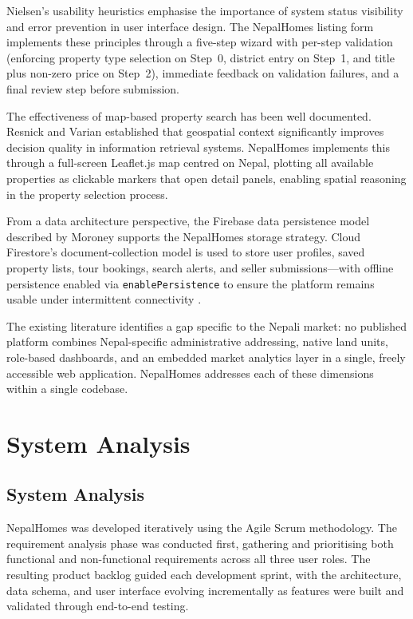 \documentclass[12pt,a4paper]{report}
\begin{document}
Nielsen's usability heuristics \cite{nielsen1994} emphasise the importance of
system status visibility and error prevention in user interface design. The
NepalHomes listing form implements these principles through a five-step wizard
with per-step validation (enforcing property type selection on Step~0, district
entry on Step~1, and title plus non-zero price on Step~2), immediate feedback
on validation failures, and a final review step before submission.

The effectiveness of map-based property search has been well documented.
Resnick and Varian \cite{resnick1997} established that geospatial context
significantly improves decision quality in information retrieval systems.
NepalHomes implements this through a full-screen Leaflet.js map centred on
Nepal, plotting all available properties as clickable markers that open detail
panels, enabling spatial reasoning in the property selection process.

From a data architecture perspective, the Firebase data persistence model
described by Moroney \cite{moroney2017} supports the NepalHomes storage
strategy. Cloud Firestore's document-collection model is used to store user
profiles, saved property lists, tour bookings, search alerts, and seller
submissions---with offline persistence enabled via \texttt{enablePersistence}
to ensure the platform remains usable under intermittent connectivity \cite{firebase2024}.

The existing literature identifies a gap specific to the Nepali market: no
published platform combines Nepal-specific administrative addressing, native
land units, role-based dashboards, and an embedded market analytics layer in a
single, freely accessible web application. NepalHomes addresses each of these
dimensions within a single codebase.

\chapter{System Analysis}

\section{System Analysis}

NepalHomes was developed iteratively using the Agile Scrum methodology. The
requirement analysis phase was conducted first, gathering and prioritising both
functional and non-functional requirements across all three user roles. The
resulting product backlog guided each development sprint, with the architecture,
data schema, and user interface evolving incrementally as features were built and
validated through end-to-end testing.
\end{document}
